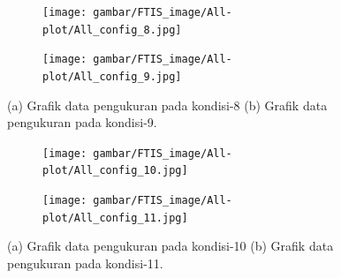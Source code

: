 \begin{figure}[H]
	\begin{subfigure}{0.49\textwidth}
		\centering
		\texttt{[image: gambar/FTIS\_image/All-plot/All\_config\_8.jpg]}
		\caption{}
		\label{fig:condition_8}
	\end{subfigure}
	\centering
	\begin{subfigure}{0.49\textwidth}
		\centering
		\texttt{[image: gambar/FTIS\_image/All-plot/All\_config\_9.jpg]}
		\caption{}
		\label{fig:condition_9}
	\end{subfigure}
	\caption{(a) Grafik data pengukuran pada kondisi-8 (b) Grafik data pengukuran pada kondisi-9.}
\end{figure}

\begin{figure}[H]
	\begin{subfigure}{0.49\textwidth}
		\centering
		\texttt{[image: gambar/FTIS\_image/All-plot/All\_config\_10.jpg]}
		\caption{}
		\label{fig:condition_10}
	\end{subfigure}
	\centering
	\begin{subfigure}{0.49\textwidth}
		\centering
		\texttt{[image: gambar/FTIS\_image/All-plot/All\_config\_11.jpg]}
		\caption{}
		\label{fig:condition_11}
	\end{subfigure}
	\caption{(a) Grafik data pengukuran pada kondisi-10 (b) Grafik data pengukuran pada kondisi-11.}
\end{figure}

